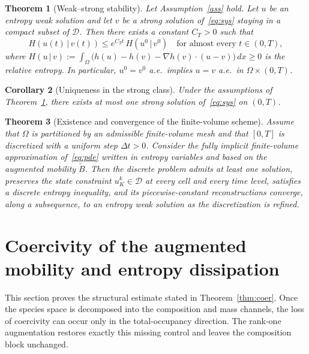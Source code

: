 \documentclass{article}
\newtheorem{theorem}{Theorem}[section]
\newtheorem{corollary}[theorem]{Corollary}
\newcommand{\D}{\mathcal{D}}
\newcommand{\Be}{\widetilde{B}}       %
\begin{document}
\begin{theorem}[Weak--strong stability]\label{thm:wsu}
Let Assumption~\ref{ass} hold. Let $u$ be an entropy weak solution and
let $v$ be a strong solution of~\eqref{eq:sys} staying in a compact
subset of $\D$. Then there exists a constant $C_T>0$ such that
\begin{equation}\label{eq:gronwall}
  H(u(t)\,|\,v(t)) \le e^{C_T t}\,H(u^0\,|\,v^0)
  \quad\text{for almost every }t\in(0,T),
\end{equation}
where $H(u\,|\,v) := \int_\Omega\bigl(h(u)-h(v)-\nabla h(v)\cdot(u-v)\bigr)\,dx\ge 0$
is the relative entropy. In particular, $u^0=v^0$ a.e.\ implies
$u=v$ a.e.\ in $\Omega\times(0,T)$.
\end{theorem}

\begin{corollary}[Uniqueness in the strong class]\label{cor:uniq}
Under the assumptions of Theorem~\ref{thm:wsu}, there exists at most
one strong solution of~\eqref{eq:sys} on $(0,T)$.
\end{corollary}

\begin{theorem}[Existence and convergence of the finite-volume scheme]
\label{thm:FV}
Assume that $\Omega$ is partitioned by an admissible finite-volume mesh
and that $[0,T]$ is discretized with a uniform step $\Delta t>0$.
Consider the fully implicit finite-volume approximation of~\eqref{eq:pde}
written in entropy variables and based on the augmented mobility $\Be$.
Then the discrete problem admits at least one solution, preserves the
state constraint $u^k_K\in\D$ at every cell and every time level, satisfies a
discrete entropy inequality, and its piecewise-constant reconstructions
converge, along a subsequence, to an entropy weak solution as the
discretization is refined.
\end{theorem}

\section{Coercivity of the augmented mobility and entropy dissipation}
\label{sec:coer}

This section proves the structural estimate stated in
Theorem~\ref{thm:coer}. Once the species space is decomposed into the
composition and mass channels, the loss of coercivity can occur only in
the total-occupancy direction. The rank-one augmentation restores exactly
this missing control and leaves the composition block unchanged.
\end{document}

